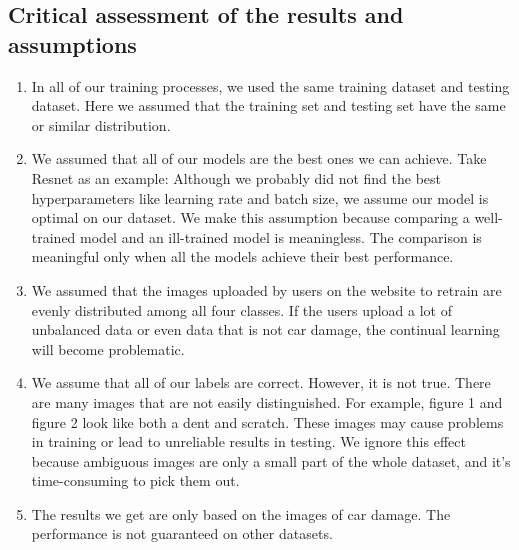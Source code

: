 \documentclass[lang=english,inputenc=utf8,fontsize=10pt]{ldvarticle}
\begin{document}
\subsection{Critical assessment of the results and assumptions}
\begin{enumerate}
    \item In all of our training processes, we used the same training dataset and testing dataset. Here we assumed that the training set and testing set have the same or similar distribution.\\
    \item We assumed that all of our models are the best ones we can achieve. Take Resnet as an example: Although we probably did not find the best hyperparameters like learning rate and batch size, we assume our model is optimal on our dataset. We make this assumption because comparing a well-trained model and an ill-trained model is meaningless. The comparison is meaningful only when all the models achieve their best performance.\\
    \item We assumed that the images uploaded by users on the website to retrain are evenly distributed among all four classes. If the users upload a lot of unbalanced data or even data that is not car damage, the continual learning will become problematic.\\
    \item We assume that all of our labels are correct. However, it is not true. There are many images that are not easily distinguished. For example, figure 1 and figure 2 look like both a dent and scratch. These images may cause problems in training or lead to unreliable results in testing. We ignore this effect because ambiguous images are only a small part of the whole dataset, and it’s time-consuming to pick them out.
    
    \item The results we get are only based on the images of car damage. The performance is not guaranteed on other datasets.
\end{enumerate}
\end{document}
